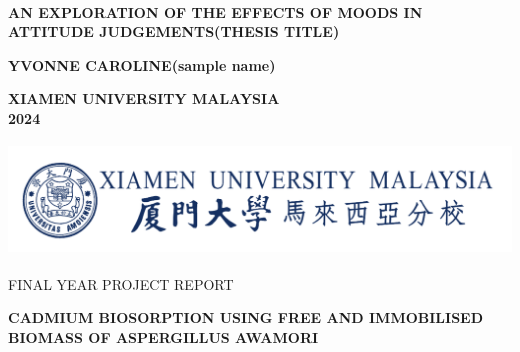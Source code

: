 \documentclass[12pt, a4paper]{report}
\begin{document}
	\begin{center}		
		\titlefont
		\uppercase{\textbf{\large{\\ \vspace{2cm} AN EXPLORATION OF THE EFFECTS OF MOODS IN ATTITUDE JUDGEMENTS(Thesis title)}}}            %
		
		\vspace{7cm}
		
		\textbf{\large YVONNE CAROLINE(sample name)}   %
		
		\vspace{10cm}
		
		\uppercase{\textbf{\large{Xiamen University Malaysia}}}
		\\
		\vspace{0.5cm}
		\uppercase{\textbf{\large{2024}}}
	\end{center}
	
	
	
	
	
	
	
	
	
	
	
	
	
	
	
	
	
	
	
	
	
	
	
	\newpage
	\centering
	\includegraphics[width=14.53cm,height=3cm]{XMUM LOGO.png}
	
	\vspace{2cm}
	
	{\centering
		\fypsentence
		FINAL YEAR PROJECT REPORT
		\par}
	
	\vspace{3.5cm}
	{\centering
		\theistitle
		\textbf{CADMIUM BIOSORPTION USING FREE 
			AND IMMOBILISED BIOMASS OF ASPERGILLUS AWAMORI
		}\par}  %
	
	\vspace{4cm}
	
\end{document}
